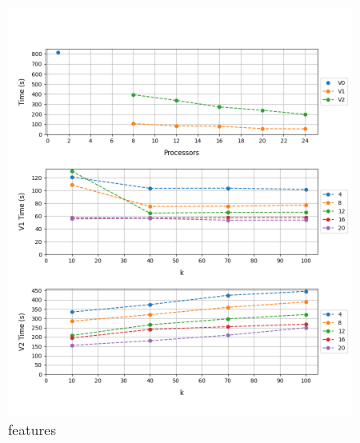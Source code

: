\documentclass[12pt, a4paper]{article}
\begin{document}
\begin{figure}[h!]
     \begin{subfigure}[b]{0.33\textwidth}
         \centering
         \includegraphics[height=.4\textheight, width=\textwidth, keepaspectratio]{assets/black_sheep.png}
    \caption{features}
     \end{subfigure}
     \hfill
     \begin{subfigure}[b]{0.33\textwidth}
         \centering

\end{subfigure}
\end{figure}
\end{document}
